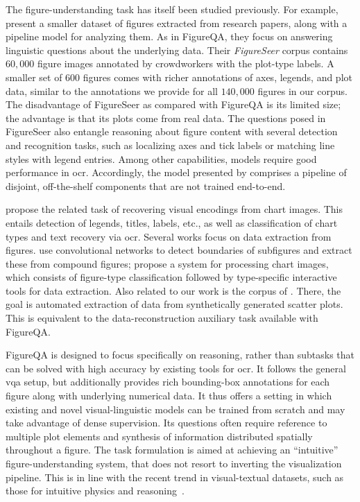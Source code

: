 \documentclass{article} \usepackage{iclr2018_workshop,times}
\begin{document}
The figure-understanding task has itself been studied previously.
For example, \citet{siegel2016figureseer} present a smaller dataset of figures extracted from research papers, along with a pipeline model for analyzing them.
As in FigureQA, they focus on answering linguistic questions about the underlying data. 
Their \emph{FigureSeer} corpus contains $60,000$ figure images annotated by crowdworkers with the plot-type labels.
A smaller set of 600 figures comes with richer annotations of axes, legends, and plot data, similar to the annotations we provide for all $140,000$ figures in our corpus.
The disadvantage of FigureSeer as compared with FigureQA is its limited size; the advantage is that its plots come from real data.
The questions posed in FigureSeer also entangle reasoning about figure content with several detection and recognition tasks, such as localizing axes and tick labels or matching line styles with legend entries. Among other capabilities, models require good performance in \gls{ocr}.
Accordingly, the model presented by \citet{siegel2016figureseer} comprises a pipeline of disjoint, off-the-shelf components that are not trained end-to-end.

\citet{poco2017reverse} propose the related task of recovering visual encodings from chart images. This entails detection of legends, titles, labels, etc., as well as classification of chart types and text recovery via \gls{ocr}.
Several works focus on data extraction from figures.
\citet{tsutsui2017data} use convolutional networks to detect boundaries of subfigures and extract these from compound figures;
\citet{jung2017chartsense} propose a system for processing chart images, which consists of figure-type classification followed by type-specific interactive tools for data extraction.
Also related to our work is the corpus of \citet{cliche2017scatteract}.
There, the goal is automated extraction of data from synthetically generated scatter plots. This is equivalent to the data-reconstruction auxiliary task available with FigureQA.

FigureQA is designed to focus specifically on reasoning, rather than subtasks that can be solved with high accuracy by existing tools for \gls{ocr}.
It follows the general \gls{vqa} setup, but additionally provides rich 
bounding-box annotations for each figure along with underlying numerical data.
It thus offers a setting in which existing and novel visual-linguistic models can be trained from scratch 
and may take advantage of dense supervision.
Its questions often require reference to multiple plot elements and synthesis of information distributed spatially throughout a figure.
The task formulation is aimed at achieving an ``intuitive'' figure-understanding system, that does not resort to inverting the visualization pipeline. This is in line with the recent trend in visual-textual datasets, such as those for intuitive physics and reasoning~\citep{goyal2017something,mun2016marioqa}.
\end{document}
